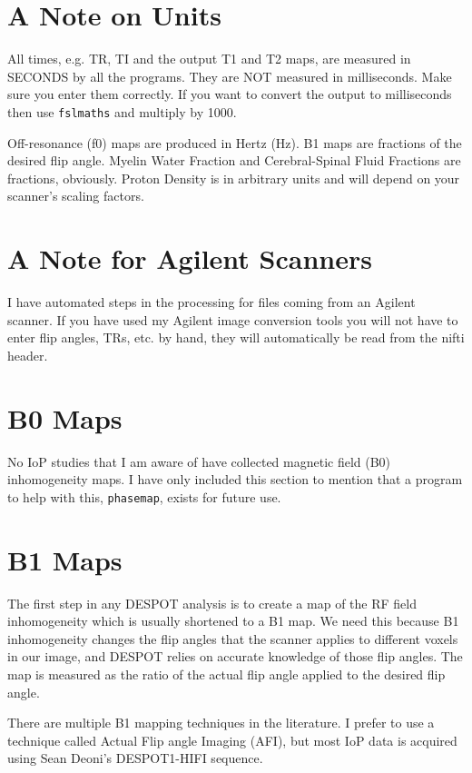 \documentclass{report}
\begin{document}
\section{A Note on Units}

All times, e.g. TR, TI and the output T1 and T2 maps, are measured in SECONDS by all the programs. They are NOT measured in milliseconds. Make sure you enter them correctly. If you want to convert the output to milliseconds then use \texttt{fslmaths} and multiply by 1000.

Off-resonance (f0) maps are produced in Hertz (Hz). B1 maps are fractions of the desired flip angle. Myelin Water Fraction and Cerebral-Spinal Fluid Fractions are fractions, obviously. Proton Density is in arbitrary units and will depend on your scanner's scaling factors.

\section{A Note for Agilent Scanners}

I have automated steps in the processing for files coming from an Agilent scanner. If you have used my Agilent image conversion tools you will not have to enter flip angles, TRs, etc. by hand, they will automatically be read from the nifti header.

\section{B0 Maps}

No IoP studies that I am aware of have collected magnetic field (B0) inhomogeneity maps. I have only included this section to mention that a program to help with this, \texttt{phasemap}, exists for future use.

\section{B1 Maps}

The first step in any DESPOT analysis is to create a map of the RF field inhomogeneity which is usually shortened to a B1 map. We need this because B1 inhomogeneity changes the flip angles that the scanner applies to different voxels in our image, and DESPOT relies on accurate knowledge of those flip angles. The map is measured as the ratio of the actual flip angle applied to the desired flip angle.

There are multiple B1 mapping techniques in the literature. I prefer to use a technique called Actual Flip angle Imaging (AFI), but most IoP data is acquired using Sean Deoni's DESPOT1-HIFI sequence.
\end{document}
